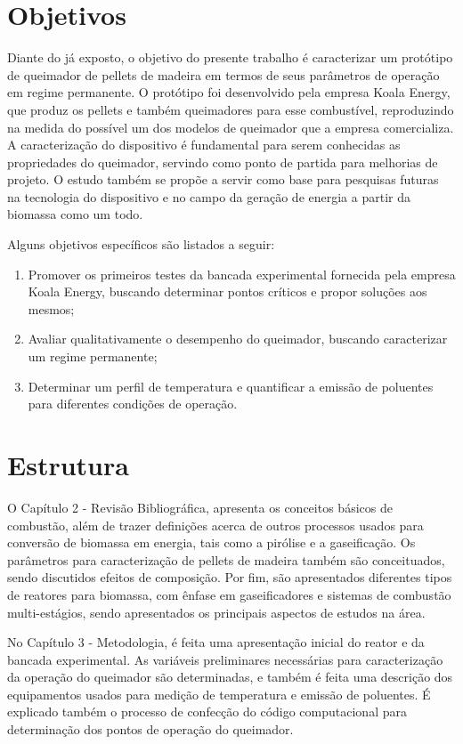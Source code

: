 \section{Objetivos}

Diante do já exposto, o objetivo do presente trabalho é caracterizar um protótipo de queimador de pellets de madeira em termos de seus parâmetros de operação em regime permanente. O protótipo foi desenvolvido pela empresa Koala Energy, que produz os pellets e também queimadores para esse combustível, reproduzindo na medida do possível um dos modelos de queimador que a empresa comercializa. A caracterização do dispositivo é fundamental para serem conhecidas as propriedades do queimador, servindo como ponto de partida para melhorias de projeto. O estudo também se propõe a servir como base para pesquisas futuras na tecnologia do dispositivo e no campo da geração de energia a partir da biomassa como um todo.

Alguns objetivos específicos são listados a seguir:
\begin{enumerate}[noitemsep,nosep,labelindent=\parindent,leftmargin=*,label={\alph*}) ] 
	\item Promover os primeiros testes da bancada experimental fornecida pela empresa Koala Energy, buscando determinar pontos críticos e propor soluções aos mesmos;
	\item Avaliar qualitativamente o desempenho do queimador, buscando caracterizar um regime permanente;
	\item Determinar um perfil de temperatura e quantificar a emissão de poluentes para diferentes condições de operação.
\end{enumerate}

\section{Estrutura}
O Capítulo 2 - Revisão Bibliográfica, apresenta os conceitos básicos de combustão, além de trazer definições acerca de outros processos usados para conversão de biomassa em energia, tais como a pirólise e a gaseificação. Os parâmetros para caracterização de pellets de madeira também são conceituados, sendo discutidos efeitos de composição. Por fim, são apresentados diferentes tipos de reatores para biomassa, com ênfase em gaseificadores e sistemas de combustão multi-estágios, sendo apresentados os principais aspectos de estudos na área.

No Capítulo 3 - Metodologia, é feita uma apresentação inicial do reator e da bancada experimental. As variáveis preliminares necessárias para caracterização da operação do queimador são determinadas, e também é feita uma descrição dos equipamentos usados para medição de temperatura e emissão de poluentes. É explicado também o processo de confecção do código computacional para determinação dos pontos de operação do queimador.

